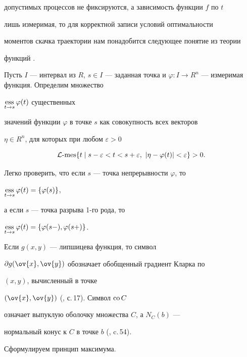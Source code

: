 допустимых процессов не фиксируются, а зависимость функции $f$ по $t$


лишь измеримая, то для корректной записи условий оптимальности


моментов скачка траектории нам понадобится следующее понятие из теории


функций \cite{K.B.}.





Пусть $I$ --- интервал из $R$, $s \in I$ --- заданная точка и $\varphi: I


\rightarrow R^n$ --- измеримая функция. Определим множество


$\ess\limits_{t \rightarrow s}\varphi (t)$ существенных


значений функции $\varphi$ в точке $s$ как совокупность всех векторов


$\eta\in R^n$, для которых при любом $\varepsilon >0$


$$


{\cal L}\text{-mes}\{t\mid s-\varepsilon <t< s+\varepsilon,\


|\eta-\varphi(t)|< \varepsilon \}>0.


$$


Легко проверить, что если $s$ --- точка непрерывности $\varphi$, то


$\ess\limits_{t \rightarrow s}\varphi


(t)=\{\varphi(s)\}$,


а если $s$ --- точка разрыва 1-го рода, то


$\ess\limits_{t \rightarrow s}\varphi(t)= \{\varphi(s-),


\varphi(s+)\}$.





Если $g(x,y)$ --- липшицева функция, то символ


$\partial g(\ov{x},\ov{y})$ обозначает обобщенный градиент Кларка по


$(x,y)$, вычисленный в точке


$(\ov{x},\ov{y})$ (\cite{K}, с.\,17). Символ $\text{co\,}C$


означает выпуклую оболочку множества $C$, а $N_C(b)$ ---


нормальный конус к $C$ в точке $b$ (\cite{K}, c.\,54).





Сформулируем принцип максимума.





